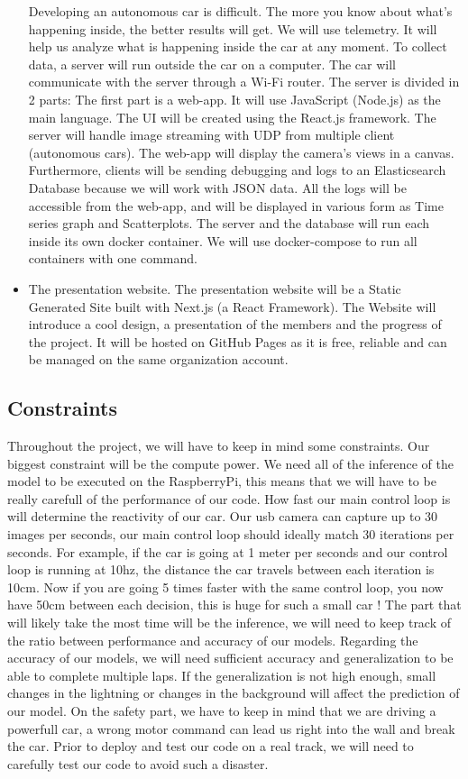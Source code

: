 \documentclass[12pt]{article}
\begin{document}
\begin{itemize}
Developing an autonomous car is difficult. The more you know about what’s happening inside, the better results will get. We will use telemetry. It will help us analyze what is happening inside the car at any moment. To collect data, a server will run outside the car on a computer. The car will communicate with the server through a Wi-Fi router. The server is divided in 2 parts: The first part is a web-app. It will use JavaScript (Node.js) as the main language. The UI will be created using the React.js framework. The server will handle image streaming with UDP from multiple client (autonomous cars). The web-app will display the camera’s views in a canvas. Furthermore, clients will be sending debugging and logs to an Elasticsearch Database because we will work with JSON data. All the logs will be accessible from the web-app, and will be displayed in various form as Time series graph and Scatterplots. The server and the database will run each inside its own docker container. We will use docker-compose to run all containers with one command.

\item The presentation website. The presentation website will be a Static Generated Site built with Next.js (a React Framework). The Website will introduce a cool design, a presentation of the members and the progress of the project. It will be hosted on GitHub Pages as it is free, reliable and can be managed on the same organization account.
\end{itemize}

\newpage
\subsection{Constraints}
Throughout the project, we will have to keep in mind some constraints.
Our biggest constraint will be the compute power. We need all of the inference of the model to be executed on the RaspberryPi, this means that we will have to be really carefull of the performance of our code. How fast our main control loop is will determine the reactivity of our car. Our usb camera can capture up to 30 images per seconds, our main control loop should ideally match 30 iterations per seconds. For example, if the car is going at 1 meter per seconds and our control loop is running at 10hz, the distance the car travels between each iteration is 10cm. Now if you are going 5 times faster with the same control loop, you now have 50cm between each decision, this is huge for such a small car ! The part that will likely take the most time will be the inference, we will need to keep track of the ratio between performance and accuracy of our models.
Regarding the accuracy of our models, we will need sufficient accuracy and generalization to be able to complete multiple laps. If the generalization is not high enough, small changes in the lightning or changes in the background will affect the prediction of our model.
On the safety part, we have to keep in mind that we are driving a powerfull car, a wrong motor command can lead us right into the wall and break the car. Prior to deploy and test our code on a real track, we will need to carefully test our code to avoid such a disaster.
\end{document}
